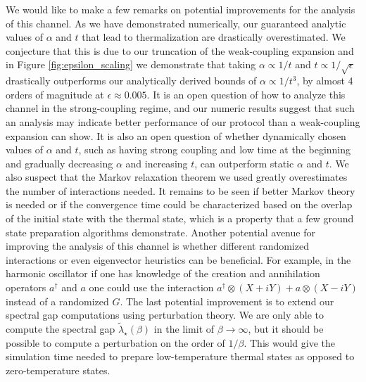 \documentclass[
 amsmath,amssymb,
 aps,
onecolumn, 
nofootinbib]{revtex4-2}
\begin{document}
We would like to make a few remarks on potential improvements for the analysis of this channel. As we have demonstrated numerically, our guaranteed analytic values of $\alpha$ and $t$ that lead to thermalization are drastically overestimated. We conjecture that this is due to our truncation of the weak-coupling expansion and in Figure \ref{fig:epsilon_scaling} we demonstrate that taking $\alpha \propto 1/t$ and $t \propto 1/ \sqrt{\epsilon}$ drastically outperforms our analytically derived bounds of $\alpha \propto 1/t^3$, by almost 4 orders of magnitude at $\epsilon \approx 0.005$. It is an open question of how to analyze this channel in the strong-coupling regime, and our numeric results suggest that such an analysis may indicate better performance of our protocol than a weak-coupling expansion can show. It is also an open question of whether dynamically chosen values of $\alpha$ and $t$, such as having strong coupling and low time at the beginning and gradually decreasing $\alpha$ and increasing $t$, can outperform static $\alpha$ and $t$. We also suspect that the Markov relaxation theorem we used greatly overestimates the number of interactions needed. It remains to be seen if better Markov theory is needed or if the convergence time could be characterized based on the overlap of the initial state with the thermal state, which is a property that a few ground state preparation algorithms demonstrate. Another potential avenue for improving the analysis of this channel is whether different randomized interactions or even eigenvector heuristics can be beneficial. For example, in the harmonic oscillator if one has knowledge of the creation and annihilation operators $a^\dagger$ and $a$ one could use the interaction $a^\dagger \otimes (X + i Y) + a \otimes (X - i Y)$ instead of a randomized $G$. The last potential improvement is to extend our spectral gap computations using perturbation theory. We are only able to compute the spectral gap $\widetilde{\lambda}_\star(\beta)$ in the limit of $\beta \to \infty$, but it should be possible to compute a perturbation on the order of $1/\beta$. This would give the simulation time needed to prepare low-temperature thermal states as opposed to zero-temperature states.
\end{document}
